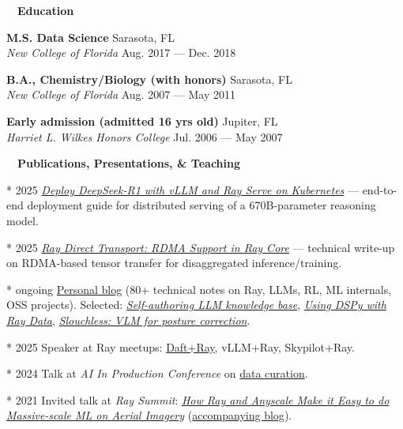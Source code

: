 \documentclass[a4paper,12pt]{article}
\newcommand{\resheading}[1]{{\hspace{-9pt} \colorbox{mygrey}{\begin{minipage}{\textwidth}{\textmd{~~\large \textbf{#1} \vphantom{p\^{E}}}}\end{minipage}}\vspace{6pt}} }
\newcommand{\ressubheading}[4]{{\begin{minipage}{\textwidth}
                                    \textbf{#1} \hfill #2 \\
                                    \textit{#3} \hfill #4 \\
\end{minipage}}}
\begin{document}
    \resheading{Education}

    \ressubheading{M.S. Data Science}{Sarasota, FL}{New College of Florida}{Aug. 2017 --- Dec. 2018}


    \ressubheading{B.A., Chemistry/Biology (with honors)}{Sarasota, FL}{New College of Florida}{Aug. 2007 --- May 2011}

    \ressubheading{Early admission (admitted 16 yrs old)}{Jupiter, FL}{Harriet L. Wilkes Honors College}{Jul. 2006 --- May 2007}

    \resheading{Publications, Presentations, \& Teaching}

    * 2025 \textit{\href{https://www.anyscale.com/blog/deepseek-vllm-ray-google-kubernetes}{Deploy DeepSeek-R1 with vLLM and Ray Serve on Kubernetes}} --- end-to-end deployment guide for distributed serving of a 670B-parameter reasoning model.

    * 2025 \textit{\href{https://www.anyscale.com/blog/ray-direct-transport-rdma-support-in-ray-core}{Ray Direct Transport: RDMA Support in Ray Core}} --- technical write-up on RDMA-based tensor transfer for disaggregated inference/training.

    * ongoing \href{https://www.ricardodecal.com}{Personal blog} (80+ technical notes on Ray, LLMs, RL, ML internals, OSS projects). Selected: \textit{\href{https://www.ricardodecal.com/projects/self-authoring-llm-knowledge-base/}{Self-authoring LLM knowledge base}}, \textit{\href{https://www.ricardodecal.com/guides/using-ds-py-with-ray-data/}{Using DSPy with Ray Data}}, \textit{\href{https://www.ricardodecal.com/projects/slouchless-using-ai-to-improve-my-posture/}{Slouchless: VLM for posture correction}}.

    * 2025 Speaker at Ray meetups: \href{https://luma.com/u5p41kte}{Daft+Ray}, vLLM+Ray, Skypilot+Ray.

    * 2024 Talk at \textit{AI In Production Conference} on \href{https://www.aiinproduction.com/speakers/richard_decal}{data curation}.

    * 2021 Invited talk at \textit{Ray Summit}: \href{https://www.anyscale.com/events/2021/06/22/how-ray-and-anyscale-make-it-easy-to-do-massive-scale-ml-on-aerial-imagery}{\textit{How Ray and Anyscale Make it Easy to do Massive-scale ML on Aerial Imagery}} (\href{https://www.anyscale.com/blog/how-ray-and-anyscale-make-it-easy-to-do-massive-scale-machine-learning-on}{accompanying blog}).
\end{document}
